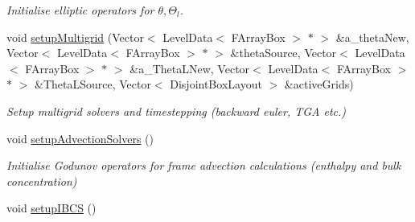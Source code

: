\begin{DoxyCompactItemize}
\begin{DoxyCompactList}\small\item\em Initialise elliptic operators for $ \theta, \Theta_l $. \end{DoxyCompactList}\item 
\hypertarget{classamr_mushy_layer_a028dcc5f3cd2e10ebc5367d028e53d92}{void \hyperlink{classamr_mushy_layer_a028dcc5f3cd2e10ebc5367d028e53d92}{setup\-Multigrid} (Vector$<$ Level\-Data$<$ F\-Array\-Box $>$ $\ast$ $>$ \&a\-\_\-theta\-New, Vector$<$ Level\-Data$<$ F\-Array\-Box $>$ $\ast$ $>$ \&theta\-Source, Vector$<$ Level\-Data$<$ F\-Array\-Box $>$ $\ast$ $>$ \&a\-\_\-\-Theta\-L\-New, Vector$<$ Level\-Data$<$ F\-Array\-Box $>$ $\ast$ $>$ \&Theta\-L\-Source, Vector$<$ Disjoint\-Box\-Layout $>$ \&active\-Grids)}\label{classamr_mushy_layer_a028dcc5f3cd2e10ebc5367d028e53d92}

\begin{DoxyCompactList}\small\item\em Setup multigrid solvers and timestepping (backward euler, T\-G\-A etc.) \end{DoxyCompactList}\item 
\hypertarget{classamr_mushy_layer_a335bb9a21350557b2df0ee5213ab1a30}{void \hyperlink{classamr_mushy_layer_a335bb9a21350557b2df0ee5213ab1a30}{setup\-Advection\-Solvers} ()}\label{classamr_mushy_layer_a335bb9a21350557b2df0ee5213ab1a30}

\begin{DoxyCompactList}\small\item\em Initialise Godunov operators for frame advection calculations (enthalpy and bulk concentration) \end{DoxyCompactList}\item 
\hypertarget{classamr_mushy_layer_a26a96dc51faf448641df859c35f672f7}{void \hyperlink{classamr_mushy_layer_a26a96dc51faf448641df859c35f672f7}{setup\-I\-B\-C\-S} ()}\label{classamr_mushy_layer_a26a96dc51faf448641df859c35f672f7}


\end{DoxyCompactItemize}
